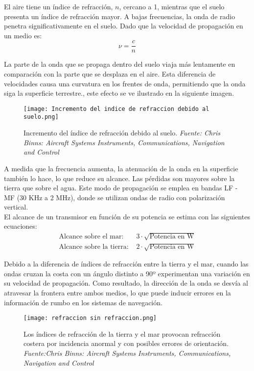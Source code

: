 El aire tiene un índice de refracción, \( n \), cercano a 1, mientras que el suelo presenta un índice de refracción mayor. A bajas frecuencias, la onda de radio penetra significativamente en el suelo. Dado que la velocidad de propagación en un medio es:
\[
\nu = \frac{c}{n}
\]

La parte de la onda que se propaga dentro del suelo viaja más lentamente en comparación con la parte que se desplaza en el aire. Esta diferencia de velocidades causa una curvatura en los frentes de onda, permitiendo que la onda siga la superficie terrestre., este efecto se ve ilustrado en la siguiente imagen.

\begin{figure}[H]
    \centering
    \texttt{[image: Incremento del indice de refraccion debido al suelo.png]}
    \caption{\centering Incremento del índice de refracción debido al suelo. \textit{ Fuente: Chris Binns: Aircraft Systems Instruments, Communications, Navigation and Control}}
    \label{fig:placeholder}
\end{figure}

A medida que la frecuencia aumenta, la atenuación de la onda en la superficie también lo hace, lo que reduce su alcance. Las pérdidas son mayores sobre la tierra que sobre el agua. Este modo de propagación se emplea en bandas LF - MF (30 KHz a 2 MHz), donde se utilizan ondas de radio con polarización vertical.\\

El alcance de un transmisor en función de su potencia se estima con las siguientes ecuaciones:
\begin{equation}
\begin{split}
\text{Alcance sobre el mar: } & 3 \cdot \sqrt{\text{Potencia en W}} \\  
\text{Alcance sobre la tierra: } & 2 \cdot \sqrt{\text{Potencia en W}}
\end{split}
\end{equation}

Debido a la diferencia de índices de refracción entre la tierra y el mar, cuando las ondas cruzan la costa con un ángulo distinto a 90º experimentan una variación en su velocidad de propagación. Como resultado, la dirección de la onda se desvía al atravesar la frontera entre ambos medios, lo que puede inducir errores en la información de rumbo en los sistemas de navegación.

\begin{figure}[H]
    \centering
    \texttt{[image: refraccion sin refraccion.png]}
    \caption{\centering Los índices de refracción de la tierra y el mar provocan refracción costera por incidencia anormal y con posibles errores de orientación. \textit{ Fuente:Chris Binns: Aircraft Systems Instruments, Communications, Navigation and Control}}
    \label{fig:placeholder}
\end{figure}

